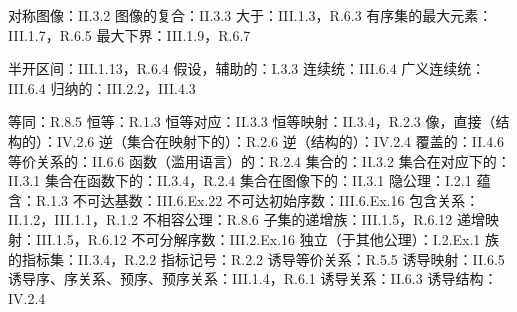 \begin{Shaded}
\begin{Highlighting}[]

\end{Highlighting}
\end{Shaded}

对称图像：II.3.2 图像的复合：II.3.3 大于：III.1.3，R.6.3 有序集的最大元素：III.1.7，R.6.5 最大下界：III.1.9，R.6.7

半开区间：III.1.13，R.6.4 假设，辅助的：I.3.3 连续统：III.6.4 广义连续统：III.6.4 归纳的：III.2.2，III.4.3

等同：R.8.5 恒等：R.1.3 恒等对应：II.3.3 恒等映射：II.3.4，R.2.3 像，直接（结构的）：IV.2.6 逆（集合在映射下的）：R.2.6 逆（结构的）：IV.2.4 覆盖的：II.4.6 等价关系的：II.6.6 函数（滥用语言）的：R.2.4 集合的：II.3.2 集合在对应下的：II.3.1 集合在函数下的：II.3.4，R.2.4 集合在图像下的：II.3.1 隐公理：I.2.1 蕴含：R.1.3 不可达基数：III.6.Ex.22 不可达初始序数：III.6.Ex.16 包含关系：II.1.2，III.1.1，R.1.2 不相容公理：R.8.6 子集的递增族：III.1.5，R.6.12 递增映射：III.1.5，R.6.12 不可分解序数：III.2.Ex.16 独立（于其他公理）：I.2.Ex.1 族的指标集：II.3.4，R.2.2 指标记号：R.2.2 诱导等价关系：R.5.5 诱导映射：II.6.5 诱导序、序关系、预序、预序关系：III.1.4，R.6.1 诱导关系：II.6.3 诱导结构：IV.2.4

